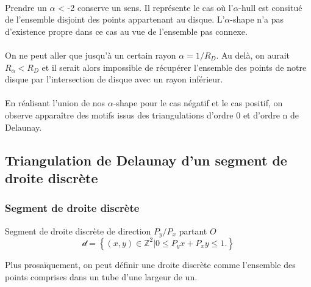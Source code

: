 \paragraph{}
Prendre un $\alpha$ < -2 conserve un sens. Il représente le cas où l'$\alpha$-hull est consitué de l'ensemble disjoint des points appartenant au disque. L'$\alpha$-shape n'a pas d'existence propre dans ce cas au vue de l'ensemble pas connexe.

\paragraph{}
On ne peut aller que jusqu'à un certain rayon $\alpha = 1/R_D$. Au delà, on aurait $R_{\alpha} < R_D$ et il serait alors impossible de récupérer l'ensemble des points de notre disque par l'intersection de disque avec un rayon inférieur.

\paragraph{}
En réalisant l'union de nos $\alpha$-shape pour le cas négatif et le cas positif, on observe apparaître des motifs issus des triangulations d'ordre 0 et d'ordre n de Delaunay. 

\subsection{Triangulation de Delaunay d'un segment de droite discrète}

\subsubsection{Segment de droite discrète}

\begin{Definition}{Segment de droite discrète de direction $P_y / P_x$ partant $O$}
\label{def:sdd}
    $$\mathcal{d} =  \left\{ (x,y) \in \mathbb{Z}^{2} |  0 \leq P_y x + P_x y \leq 1. \right\}$$
\end{Definition}

Plus prosaïquement, on peut définir une droite discrète comme l'ensemble des points comprises dans un tube d'une largeur de un.


